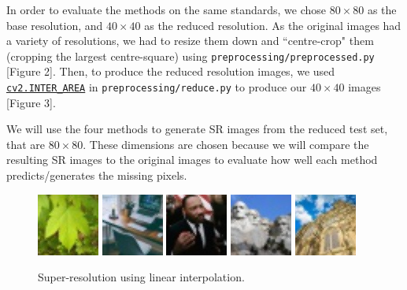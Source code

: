 \documentclass[letterpaper,12pt]{article}
\begin{document}
In order to evaluate the methods on the same standards, we chose $80\times80$ as the base resolution, and $40\times40$ as the reduced resolution. As the original images had a variety of resolutions, we had to resize them down and ``centre-crop" them (cropping the largest centre-square) using \texttt{preprocessing/preprocessed.py} [Figure 2]. Then, to produce the reduced resolution images, we used \href{https://medium.com/@wenrudong/what-is-opencvs-inter-area-actually-doing-282a626a09b3}{\texttt{cv2.INTER\_AREA}} \cite{DongW} in \texttt{preprocessing/reduce.py} to produce our $40\times40$ images [Figure 3].

\pagebreak

We will use the four methods to generate SR images from the reduced test set, that are $80\times80$. These dimensions are chosen because we will compare the resulting SR images to the original images to evaluate how well each method predicts/generates the missing pixels.

\begin{figure}[h!]
    \includegraphics[width=.2\textwidth]{linear/green-maple-leaf.jpg}\hfill
    \includegraphics[width=.2\textwidth]{linear/home-office.jpg}\hfill
    \includegraphics[width=.2\textwidth]{linear/martin-luther-king.jpg}\hfill
    \includegraphics[width=.2\textwidth]{linear/mount-rushmore.jpg}\hfill
    \includegraphics[width=.2\textwidth]{linear/salisbury-cathedral.jpg}
    \caption{Super-resolution using linear interpolation.}
\end{figure}
\end{document}
